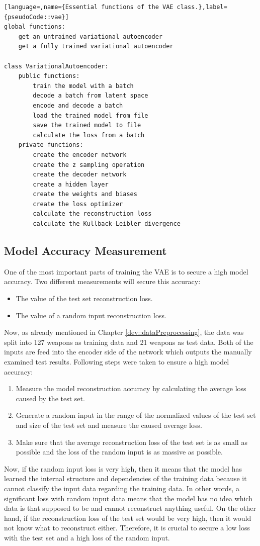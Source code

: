 \documentclass[MGS,Master,english]{twbook}%
\begin{document}
\begin{lstlisting}[language=,name={Essential functions of the VAE class.},label={pseudoCode::vae}]
global functions:
	get an untrained variational autoencoder
	get a fully trained variational autoencoder
	
class VariationalAutoencoder:
	public functions:
		train the model with a batch
		decode a batch from latent space
		encode and decode a batch
		load the trained model from file
		save the trained model to file
		calculate the loss from a batch
	private functions:
		create the encoder network
		create the z sampling operation
		create the decoder network
		create a hidden layer
		create the weights and biases
		create the loss optimizer
		calculate the reconstruction loss
		calculate the Kullback-Leibler divergence
\end{lstlisting}

\subsection{Model Accuracy Measurement}
One of the most important parts of training the \ac{VAE} is to secure a high model accuracy. Two different measurements will secure this accuracy:
\begin{itemize}
	\item The value of the test set reconstruction loss.
	\item The value of a random input reconstruction loss.
\end{itemize} 
Now, as already mentioned in Chapter \ref{dev::dataPreprocessing}, the data was split into 127 weapons as training data and 21 weapons as test data. Both of the inputs are feed into the encoder side of the network which outputs the manually examined test results. Following steps were taken to ensure a high model accuracy:
\begin{enumerate}
	\item Measure the model reconstruction accuracy by calculating the average loss caused by the test set.
	\item Generate a random input in the range of the normalized values of the test set and size of the test set and measure the caused average loss.
	\item Make sure that the average reconstruction loss of the test set is as small as possible and the loss of the random input is as massive as possible.
\end{enumerate}
Now, if the random input loss is very high, then it means that the model has learned the internal structure and dependencies of the training data because it cannot classify the input data regarding the training data. In other words, a significant loss with random input data means that the model has no idea which data is that supposed to be and cannot reconstruct anything useful. On the other hand, if the reconstruction loss of the test set would be very high, then it would not know what to reconstruct either. Therefore, it is crucial to secure a low loss with the test set and a high loss of the random input.
\end{document}
